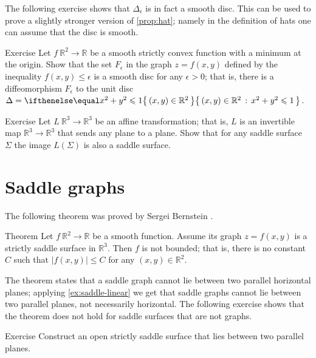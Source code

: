 The following exercise shows that $\Delta_\epsilon$ is in fact a smooth disc.
This can be used to prove a slightly stronger version of \ref{prop:hat};
namely in the definition of hats one can assume that the disc is smooth.

\begin{thm}{Exercise}\label{ex:disc-hat}
Let $f\:\mathbb{R}^2\to\mathbb{R}$ be a smooth strictly convex function with a minimum at the origin.
Show that the set $F_\epsilon$ in the graph $z=f(x,y)$ defined by the inequality $f(x,y)\le \epsilon$ is a smooth disc for any $\epsilon>0$;
that is, there is a diffeomorphism 
$F_\epsilon$ to the unit disc $\Delta\z=\set{(x,y)\in\mathbb{R}^2}{x^2+y^2\le 1}$.
\end{thm}

\begin{thm}{Exercise}\label{ex:saddle-linear}
Let $L\:\mathbb{R}^3\to\mathbb{R}^3$ be an affine transformation; that is, $L$ is an invertible map $\mathbb{R}^3\to\mathbb{R}^3$ that sends any plane to a plane. 
Show that for any saddle surface $\Sigma$ the image $L(\Sigma)$ is also a saddle surface.
\end{thm}



\section{Saddle graphs}

The following theorem was proved by Sergei Bernstein \cite{bernstein}.

\begin{thm}{Theorem}\label{thm:bernshtein}
Let $f\:\mathbb{R}^2\to\mathbb{R}$ be a smooth function.
Assume its graph $z=f(x,y)$ is a strictly saddle surface in $\mathbb{R}^3$.
Then $f$ is not bounded;
that is, there is no constant $C$ such that 
$|f(x,y)|\le C$ for any $(x,y)\in\mathbb{R}^2$.
\end{thm}

The theorem states that a saddle graph cannot lie between two parallel horizontal planes;
applying \ref{ex:saddle-linear} we get that saddle graphs cannot lie between two parallel planes,
not necessarily horizontal.
The following exercise shows that the theorem does not hold for saddle surfaces that are not graphs.


\begin{thm}{Exercise}\label{ex:between-parallels}
Construct an open strictly saddle surface that lies between two parallel planes.
\end{thm}

